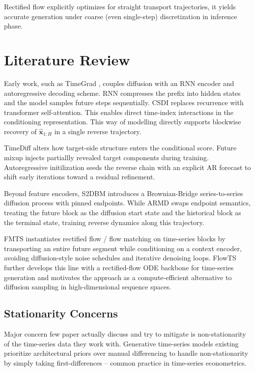 Rectified flow \cite{liu2022rectified} explicitly optimizes for straight transport trajectories, it
yields accurate generation under coarse (even single-step) discretization in inference phase.

\section{Literature Review}

Early work, such as TimeGrad \cite{rasul2021timegrad}, couples diffusion with an RNN encoder and autoregressive decoding scheme. RNN compresses the prefix into hidden states and the model samples future steps sequentially.
CSDI \cite{tashiro2021csdi} replaces recurrence with transformer self-attention. This enables direct time-index interactions in
the conditioning representation. This way of modelling directly supports blockwise recovery of $\hat{\mathbf{x}}_{1:H}$ in a
single reverse trajectory.

TimeDiff \cite{shen2023timediff} alters how target-side structure enters the conditional score. Future mixup injects partiallly revealed target components during training. Autoregressive initilization seeds the reverse chain with an explicit AR forecast to shift early
iterations toward a residual refinement.

Beyond feature encoders, S2DBM \cite{yang2024s2dbm} introduces a Brownian-Bridge series-to-series diffusion process with
pinned endpoints. While ARMD \cite{gao2024armd} swaps endpoint semantics, treating the future block as the diffusion
start state and the historical block as the terminal state, training reverse dynamics along this
trajectory.

FMTS \cite{hu2025fmts} instantiates rectified flow / flow matching on time-series blocks by transporting an entire
future segment while conditioning on a context encoder, avoiding diffusion-style noise schedules and
iterative denoising loops.
FlowTS \cite{hu2024flowts} further develops this line with a rectified-flow ODE backbone for time-series generation and
motivates the approach as a compute-efficient alternative to diffusion sampling in high-dimensional
sequence spaces.

\subsection{Stationarity Concerns}

Major concern few paper actually discuss and try to mitigate is non-stationarity of the time-series data they work with. Generative time-series models existing prioritize architectural priors over manual differencing to handle non-stationarity by simply taking first-differences -- common practice in time-series econometrics.

